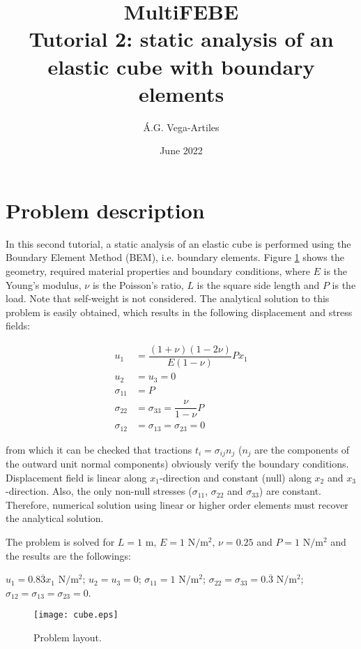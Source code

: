 \documentclass[a4]{article}
\title{MultiFEBE \\ Tutorial 2: static analysis of an elastic cube with boundary elements}
\author{\'A.G. Vega-Artiles}
\date{June 2022}
\begin{document}
\maketitle

\tableofcontents 

\section{Problem description}

In this second tutorial, a static analysis of an elastic cube is performed using the Boundary Element Method (BEM), i.e. boundary elements. Figure \ref{fig:layout} shows the geometry, required material properties and boundary conditions, where $E$ is the Young's modulus, $\nu$ is the Poisson's ratio, $L$ is the square side length and $P$ is the load. Note that self-weight is not considered. The analytical solution to this problem is easily obtained, which results in the following displacement and stress fields:

\begin{align}
u_1 &= \dfrac{(1+\nu)(1-2\nu)}{E(1-\nu)} P x_1 \\
u_2 &= u_3 = 0 \\
\sigma_{11} &= P \\
\sigma_{22} &= \sigma_{33} = \dfrac{\nu}{1-\nu}P \\
\sigma_{12} &= \sigma_{13} = \sigma_{23}= 0
\end{align}

from which it can be checked that tractions $t_i=\sigma_{ij}n_j$ ($n_j$ are the components of the outward unit normal components) obviously verify the boundary conditions. Displacement field is linear along $x_1$-direction and constant (null) along $x_2$ and $x_3$-direction. Also, the only non-null stresses ($\sigma_{11}$, $\sigma_{22}$ and $\sigma_{33}$) are constant. Therefore, numerical solution using linear or higher order elements must recover the analytical solution.

The problem is solved for $L=1$ $\mathrm{m}$, $E=1$ $\mathrm{N/m^2}$, $\nu=0.25$  and $P=1$ $\mathrm{N/m^2}$ and the results are the followings:

	$u_1 = 0.8\overline{3} x_1$ $\mathrm{N/m^2}$;
	$u_2 = u_3 = 0$;
	$\sigma_{11} = 1$ $\mathrm{N/m^2}$;
	$\sigma_{22} = \sigma_{33} = 0.\overline{3}$ $\mathrm{N/m^2}$;
	$\sigma_{12} = \sigma_{13} = \sigma_{23} = 0$.

\begin{figure}[h]
	\centering
	\texttt{[image: cube.eps]}
	\caption{Problem layout.}
	\label{fig:layout}
\end{figure}
\end{document}
